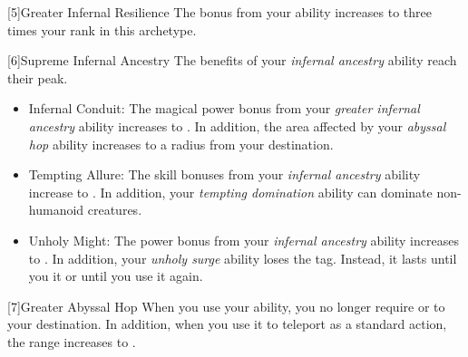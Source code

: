     [5]{Greater Infernal Resilience}  The bonus from your  ability increases to three times your rank in this archetype.

    [6]{Supreme Infernal Ancestry} The benefits of your \textit{infernal ancestry} ability reach their peak.
      \begin{itemize}
        \item Infernal Conduit: The magical power bonus from your \textit{greater infernal ancestry} ability increases to .
          In addition, the area affected by your \textit{abyssal hop} ability increases to a \medarea radius from your destination.
        \item Tempting Allure: The skill bonuses from your \textit{infernal ancestry} ability increase to .
          In addition, your \textit{tempting domination} ability can dominate non-humanoid creatures.
        \item Unholy Might: The power bonus from your \textit{infernal ancestry} ability increases to .
          In addition, your \textit{unholy surge} ability loses the  tag.
          Instead, it lasts until you  it or until you use it again.
      \end{itemize}

    [7]{Greater Abyssal Hop} When you use your  ability, you no longer require  or  to your destination.
      In addition, when you use it to teleport as a standard action, the range increases to \distrange.




